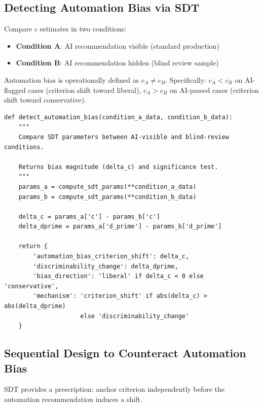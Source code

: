 \subsection{Detecting Automation Bias via SDT}

Compare $c$ estimates in two conditions:
\begin{itemize}
    \item \textbf{Condition A}: AI recommendation visible (standard production)
    \item \textbf{Condition B}: AI recommendation hidden (blind review sample)
\end{itemize}

Automation bias is operationally defined as $c_A \neq c_B$. Specifically: $c_A < c_B$ on AI-flagged cases (criterion shift toward liberal), $c_A > c_B$ on AI-passed cases (criterion shift toward conservative).

\begin{lstlisting}[style=python, caption={Automated bias monitoring in production}]
def detect_automation_bias(condition_a_data, condition_b_data):
    """
    Compare SDT parameters between AI-visible and blind-review conditions.

    Returns bias magnitude (delta_c) and significance test.
    """
    params_a = compute_sdt_params(**condition_a_data)
    params_b = compute_sdt_params(**condition_b_data)

    delta_c = params_a['c'] - params_b['c']
    delta_dprime = params_a['d_prime'] - params_b['d_prime']

    return {
        'automation_bias_criterion_shift': delta_c,
        'discriminability_change': delta_dprime,
        'bias_direction': 'liberal' if delta_c < 0 else 'conservative',
        'mechanism': 'criterion_shift' if abs(delta_c) > abs(delta_dprime)
                     else 'discriminability_change'
    }
\end{lstlisting}

\subsection{Sequential Design to Counteract Automation Bias}

SDT provides a prescription: anchor criterion independently before the automation recommendation induces a shift.

